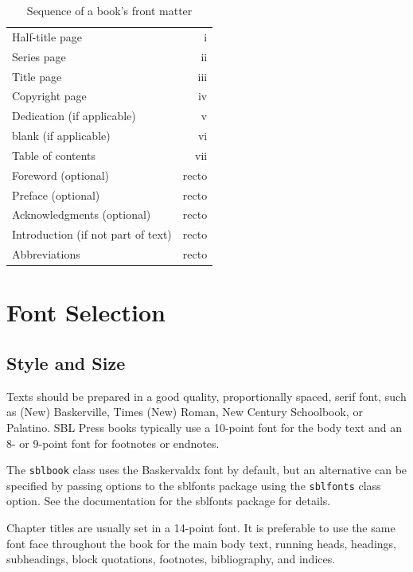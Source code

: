 \documentclass[sblidx={ancient sources, modern authors, subject}]{sblbook}
\begin{document}
\begin{table}
  \centering
  \caption{Sequence of a book's front matter}
  \label{frontmattersequence}
  \begin{tabular}{lr}
    Half-title page & i \\
    Series page & ii \\
    Title page & iii \\
    Copyright page & iv \\
    Dedication (if applicable) & v \\
    blank (if applicable) & vi \\
    Table of contents & vii \\
    Foreword (optional) & recto\index{recto} \\
    Preface (optional) & recto\index{recto} \\
    Acknowledgments (optional) & recto\index{recto} \\
    Introduction (if not part of text) & recto\index{recto} \\
    Abbreviations & recto\index{recto} \\
  \end{tabular}
\end{table}

\chapter{Font Selection}

\section{Style and Size}

Texts should be prepared in a good quality, proportionally spaced, serif font,
such as (New) Baskerville,
Times (New) Roman, New Century
Schoolbook, or
Palatino. SBL Press books typically use a 10-point font
for the body text and an 8- or 9-point font for footnotes or endnotes.

The \texttt{sblbook} class uses the Baskervaldx font
by default, but an alternative can be specified by passing options to the
\textsf{sblfonts} package using the \texttt{sblfonts} class option. See the
documentation for the \textsf{sblfonts} package for details.

Chapter titles are usually set in a 14-point font. It is preferable to use the
same font face throughout the book for the main body text, running
heads, headings, subheadings, block quotations,
footnotes, bibliography, and indices.
\end{document}
